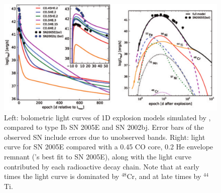 


\begin{figure}
\centerline{\includegraphics[width=1.0\hsize]{waldmanfigure.pdf}}
\caption{Left: bolometric light curves of 1D explosion models simulated by \citeauthor{wald+10}, compared to type Ib SN 2005E and SN 2002bj.  Error bars of the observed SN include errors due to unobserved bands.  Right: light curve for SN 2005E compared with a 0.45 {\Msun} CO core, 0.2 {\Msun} He envelope remnant (\citeauthor{wald+10}'s best fit to SN 2005E), along with the light curve contributed by each radioactive decay chain.  Note that at early times the light curve is dominated by $^{48}$Cr, and at late times by $^{44}$Ti.}
\label{waldmanfigure}
\end{figure}

